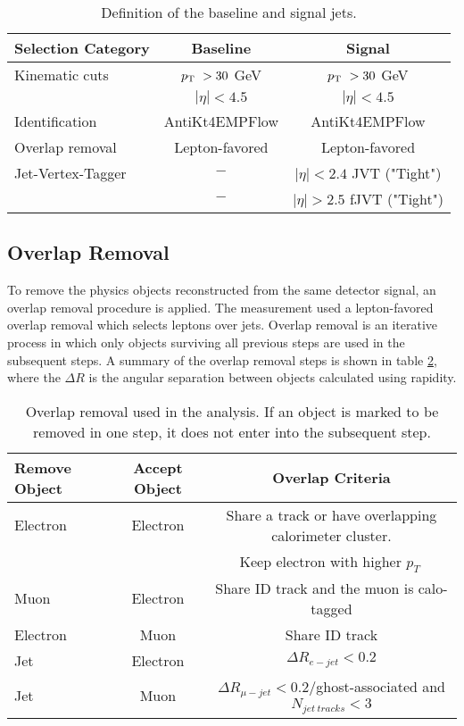 \begin{table}[ht]
	\centering
	\caption{Definition of the baseline and signal jets.\label{tab:jets}}
		\begin{tabular}{|| l || c | c ||}
		\hline
		Selection Category & \textbf{Baseline} & \textbf{Signal} \\
		\hline\hline
		Kinematic cuts & $p_{\textrm{T} ~} > 30$ GeV & $p_{\textrm{T} ~} > 30$ GeV \\
			 & $|\eta| < 4.5$ & $|\eta| < 4.5$\\
		\hline 
		Identification & AntiKt4EMPFlow & AntiKt4EMPFlow\\
		\hline
		Overlap removal & Lepton-favored & Lepton-favored\\
		\hline
		Jet-Vertex-Tagger & $-$ & $ |\eta| < 2.4 $ JVT ("Tight")\\
				& $-$ & $|\eta| > 2.5 $ fJVT ("Tight")\\
		\hline
	\end{tabular}
\end{table}

\subsection{Overlap Removal}
\label{subsec:OR}

To remove the physics objects reconstructed from the same detector signal, an overlap removal procedure is applied. The measurement used a lepton-favored overlap removal which selects leptons over jets. Overlap removal is an iterative process in which only objects surviving all previous steps are used in the subsequent steps.
A summary of the overlap removal steps is shown in table \ref{tab:overlap_removal}, where the $\Delta R$ is the angular separation between objects calculated using rapidity.

\begin{table}[ht]
	\centering
		\caption{Overlap removal used in the analysis. If an object is marked to be removed in one step, it does not enter into the subsequent step. \label{tab:overlap_removal}}
		\begin{tabular}{|| l || c | c ||}
		\hline
		Remove Object & Accept Object & Overlap Criteria \\
		\hline\hline
		Electron & Electron & Share a track or have overlapping calorimeter cluster.\\
				&		& Keep electron with higher $p_{T}~$\\
		\hline
		Muon & Electron & Share ID track and the muon is calo-tagged\\
		\hline
		Electron & Muon & Share ID track\\
		\hline
		Jet & Electron & $\Delta R_{e-jet} < 0.2$ \\
		\hline 
		Jet & Muon & $\Delta R_{\mu-jet} < 0.2/$ghost-associated and $N_{jet~tracks} < 3$\\
		\hline
	\end{tabular}
\end{table}
